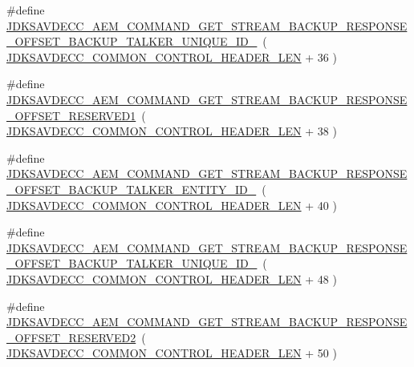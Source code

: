 \begin{DoxyCompactItemize}
\item 
\#define \hyperlink{group__command__get__stream__backup__response_gaad0207be60767442ae37da664bf42176}{J\+D\+K\+S\+A\+V\+D\+E\+C\+C\+\_\+\+A\+E\+M\+\_\+\+C\+O\+M\+M\+A\+N\+D\+\_\+\+G\+E\+T\+\_\+\+S\+T\+R\+E\+A\+M\+\_\+\+B\+A\+C\+K\+U\+P\+\_\+\+R\+E\+S\+P\+O\+N\+S\+E\+\_\+\+O\+F\+F\+S\+E\+T\+\_\+\+B\+A\+C\+K\+U\+P\+\_\+\+T\+A\+L\+K\+E\+R\+\_\+\+U\+N\+I\+Q\+U\+E\+\_\+\+I\+D\+\_}~( \hyperlink{group__jdksavdecc__avtp__common__control__header_gaae84052886fb1bb42f3bc5f85b741dff}{J\+D\+K\+S\+A\+V\+D\+E\+C\+C\+\_\+\+C\+O\+M\+M\+O\+N\+\_\+\+C\+O\+N\+T\+R\+O\+L\+\_\+\+H\+E\+A\+D\+E\+R\+\_\+\+L\+EN} + 36 )
\item 
\#define \hyperlink{group__command__get__stream__backup__response_gaaf44903f72a5a3e10678f3860e6a1b1c}{J\+D\+K\+S\+A\+V\+D\+E\+C\+C\+\_\+\+A\+E\+M\+\_\+\+C\+O\+M\+M\+A\+N\+D\+\_\+\+G\+E\+T\+\_\+\+S\+T\+R\+E\+A\+M\+\_\+\+B\+A\+C\+K\+U\+P\+\_\+\+R\+E\+S\+P\+O\+N\+S\+E\+\_\+\+O\+F\+F\+S\+E\+T\+\_\+\+R\+E\+S\+E\+R\+V\+E\+D1}~( \hyperlink{group__jdksavdecc__avtp__common__control__header_gaae84052886fb1bb42f3bc5f85b741dff}{J\+D\+K\+S\+A\+V\+D\+E\+C\+C\+\_\+\+C\+O\+M\+M\+O\+N\+\_\+\+C\+O\+N\+T\+R\+O\+L\+\_\+\+H\+E\+A\+D\+E\+R\+\_\+\+L\+EN} + 38 )
\item 
\#define \hyperlink{group__command__get__stream__backup__response_gab5c53436bdb3f409a4dd10c1bfd19bea}{J\+D\+K\+S\+A\+V\+D\+E\+C\+C\+\_\+\+A\+E\+M\+\_\+\+C\+O\+M\+M\+A\+N\+D\+\_\+\+G\+E\+T\+\_\+\+S\+T\+R\+E\+A\+M\+\_\+\+B\+A\+C\+K\+U\+P\+\_\+\+R\+E\+S\+P\+O\+N\+S\+E\+\_\+\+O\+F\+F\+S\+E\+T\+\_\+\+B\+A\+C\+K\+U\+P\+\_\+\+T\+A\+L\+K\+E\+R\+\_\+\+E\+N\+T\+I\+T\+Y\+\_\+\+I\+D\+\_}~( \hyperlink{group__jdksavdecc__avtp__common__control__header_gaae84052886fb1bb42f3bc5f85b741dff}{J\+D\+K\+S\+A\+V\+D\+E\+C\+C\+\_\+\+C\+O\+M\+M\+O\+N\+\_\+\+C\+O\+N\+T\+R\+O\+L\+\_\+\+H\+E\+A\+D\+E\+R\+\_\+\+L\+EN} + 40 )
\item 
\#define \hyperlink{group__command__get__stream__backup__response_ga6f8b2b905bcf80858adf100bf897df8d}{J\+D\+K\+S\+A\+V\+D\+E\+C\+C\+\_\+\+A\+E\+M\+\_\+\+C\+O\+M\+M\+A\+N\+D\+\_\+\+G\+E\+T\+\_\+\+S\+T\+R\+E\+A\+M\+\_\+\+B\+A\+C\+K\+U\+P\+\_\+\+R\+E\+S\+P\+O\+N\+S\+E\+\_\+\+O\+F\+F\+S\+E\+T\+\_\+\+B\+A\+C\+K\+U\+P\+\_\+\+T\+A\+L\+K\+E\+R\+\_\+\+U\+N\+I\+Q\+U\+E\+\_\+\+I\+D\+\_}~( \hyperlink{group__jdksavdecc__avtp__common__control__header_gaae84052886fb1bb42f3bc5f85b741dff}{J\+D\+K\+S\+A\+V\+D\+E\+C\+C\+\_\+\+C\+O\+M\+M\+O\+N\+\_\+\+C\+O\+N\+T\+R\+O\+L\+\_\+\+H\+E\+A\+D\+E\+R\+\_\+\+L\+EN} + 48 )
\item 
\#define \hyperlink{group__command__get__stream__backup__response_ga2510f848c66676d0e8caf7bd087a967e}{J\+D\+K\+S\+A\+V\+D\+E\+C\+C\+\_\+\+A\+E\+M\+\_\+\+C\+O\+M\+M\+A\+N\+D\+\_\+\+G\+E\+T\+\_\+\+S\+T\+R\+E\+A\+M\+\_\+\+B\+A\+C\+K\+U\+P\+\_\+\+R\+E\+S\+P\+O\+N\+S\+E\+\_\+\+O\+F\+F\+S\+E\+T\+\_\+\+R\+E\+S\+E\+R\+V\+E\+D2}~( \hyperlink{group__jdksavdecc__avtp__common__control__header_gaae84052886fb1bb42f3bc5f85b741dff}{J\+D\+K\+S\+A\+V\+D\+E\+C\+C\+\_\+\+C\+O\+M\+M\+O\+N\+\_\+\+C\+O\+N\+T\+R\+O\+L\+\_\+\+H\+E\+A\+D\+E\+R\+\_\+\+L\+EN} + 50 )

\end{DoxyCompactItemize}
